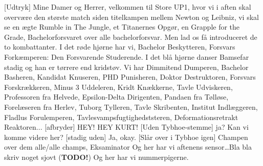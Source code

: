 \documentclass[a4paper,11pt]{article}
\begin{document}
\begin{sketch}


[Udtryk] Mine Damer og Herrer, velkommen til Store UP1, hvor vi i aften skal overvære den største match siden titelkampen mellem Newton og Leibniz, vi skal se en ægte Rumble in The Jungle, et Titanernes Opgør, en Grapple for the Grade, Bachelorforsvaret over alle bachelorforsvar. Men lad os få introduceret de to kombattanter.
I det røde hjørne har vi, Bachelor Beskytteren, Forsvars Forkæmperen: Den Forsvarende Studerende.
I det blå hjørne danser Bamsefar stadig og han er tørrere end kridstøv. Vi har Dimmitend Dumperen, Bachelor Basheren, Kandidat Knuseren, PHD Punisheren, Doktor Destruktoren, Forsvars Forskrækkeren, Minus 3 Uddeleren, Kridt Knækkerne, Tavle Udviskeren, Professoren fra Helvede, Epsilon-Delta Dirigenten, Pandaen fra Tølløse, Forelæseren fra Herlev, Tuborg Tylleren, Tavle Skribenten, Institut Indlæggeren, Fladlus Forulemperen, Tavlesvampsfugtighedststeren, Deformationsretrakt Reaktoren...
[afbryder] HEY! HEY KURT!
[Uden Tybhoe-stemme] ja?
 Kan vi komme videre her?
[stadig uden] Ja, okay.
[Slår over i Tybhoe igen] Champen over dem alle/alle champs, Eksaminator
 Og her har vi aftenens sensor\ldots Bla bla skriv noget sjovt (\textbf{TODO!})
Og her har vi nummerpigerne.

\end{sketch}
\end{document}
